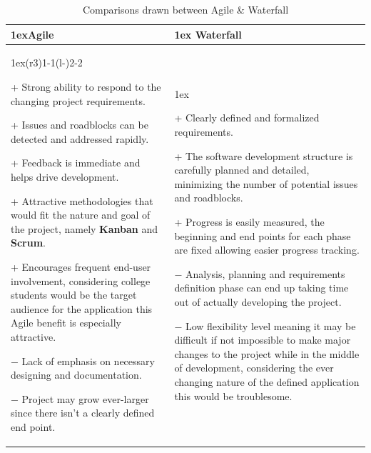 \begin{table}[H]
\begin{tabularx}{\linewidth}{>{\parskip1ex}X@{\kern4\tabcolsep}>{\parskip1ex}X}
\toprule
\hfil\bfseries Agile
&
\hfil\bfseries Waterfall
\\\cmidrule(r{3\tabcolsep}){1-1}\cmidrule(l{-\tabcolsep}){2-2}

\begin{compactitem}[-]
\item[+] Strong ability to respond to the changing project requirements.
\item[+] Issues and roadblocks can be detected and addressed rapidly. 
\item[+] Feedback is immediate and helps drive development.
\item[+] Attractive methodologies that would fit the nature and goal of the project, namely \textbf{Kanban} and  \textbf{Scrum}.
\item[+] Encourages frequent end-user involvement, considering college students would be the target audience for the application this Agile benefit is especially attractive. 
\item[$-$] Lack of emphasis on necessary designing and documentation.
\item[$-$] Project may grow ever-larger since there isn't a clearly defined end point.

\end{compactitem}
\par

&

\begin{compactitem}[-]
\item[+] Clearly defined and formalized requirements.
\item[+] The software development structure is carefully planned and detailed, minimizing the number of potential issues and roadblocks.
\item[+] Progress is easily measured, the beginning and end points for each phase are fixed allowing easier progress tracking.
\item[$-$] Analysis, planning and requirements definition phase can end up taking time out of actually developing the project.
\item[$-$] Low flexibility level meaning it may be difficult if not impossible to make major changes to the project while in the middle of development, considering the ever changing nature of the defined application this would be troublesome.
\end{compactitem}

\\\bottomrule
\end{tabularx}
\caption{Comparisons drawn between Agile \& Waterfall}
\end{table}

